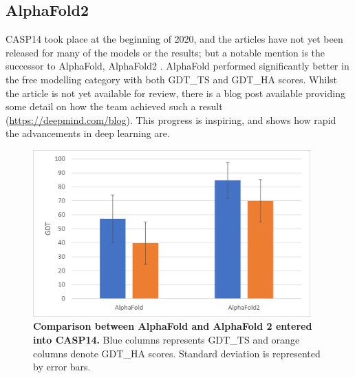 \subsection{AlphaFold2}

CASP14 took place at the beginning of 2020, and the articles have not yet been released for many of the models or the results; but a notable mention is the successor to AlphaFold, AlphaFold2 \cite{jumperHighAccuracyProtein2021}. AlphaFold performed significantly better in the free modelling category with both GDT\_TS and GDT\_HA scores. Whilst the article is not yet available for review, there is a blog post available providing some detail on how the team achieved such a result (\href{https://deepmind.com/blog/article/alphafold-a-solution-to-a-50-year-old-grand-challenge-in-biology}{https://deepmind.com/blog}). This progress is inspiring, and shows how rapid the advancements in deep learning are. 

\begin{figure}
    \begin{small}
        \begin{center}
            \includegraphics[width=0.95\textwidth]{images/alphafold_comparison.png}
        \end{center}
        \caption{\textbf{Comparison between AlphaFold \cite{seniorImprovedProteinStructure2020} and AlphaFold 2 entered into CASP14.} Blue columns represents GDT\_TS and orange columns denote GDT\_HA scores. Standard deviation is represented by error bars.}
        \label{fig:alphafold_comparison}
    \end{small}
\end{figure}




